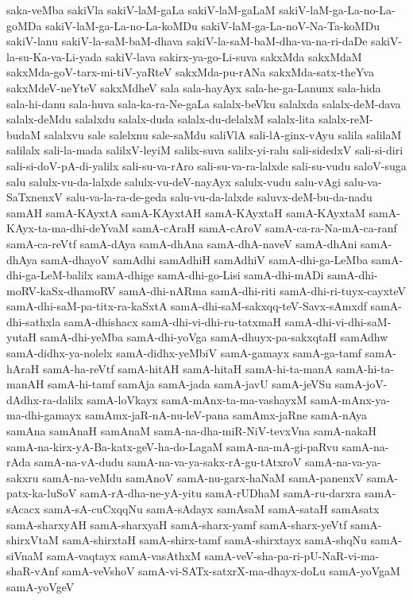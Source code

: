 {saka-veMba
sakiVla
sakiV-laM-gaLa
sakiV-laM-gaLaM
sakiV-laM-ga-La-no-La-goMDa
sakiV-laM-ga-La-no-La-koMDu
sakiV-laM-ga-La-noV-Na-Ta-koMDu
sakiV-lanu
sakiV-la-saM-baM-dhava
sakiV-la-saM-baM-dha-va-na-ri-daDe
sakiV-la-su-Ka-va-Li-yada
sakiV-lava
sakirx-ya-go-Li-suva
sakxMda
sakxMdaM
sakxMda-goV-tarx-mi-tiV-yaRteV
sakxMda-pu-rANa
sakxMda-satx-theYva
sakxMdeV-neYteV
sakxMdheV
sala
sala-hayAyx
sala-he-ga-Lanunx
sala-hida
sala-hi-danu
sala-huva
sala-ka-ra-Ne-gaLa
salalx-beVku
salalxda
salalx-deM-dava
salalx-deMdu
salalxdu
salalx-duda
salalx-du-delalxM
salalx-lita
salalx-reM-budaM
salalxvu
sale
salelxnu
sale-saMdu
saliVlA
sali-lA-ginx-vAyu
salila
salilaM
salilalx
sali-la-mada
salilxV-leyiM
salilx-suva
salilx-yi-ralu
sali-sidedxV
sali-si-diri
sali-si-doV-pA-di-yalilx
sali-su-va-rAro
sali-su-va-ra-lalxde
sali-su-vudu
saloV-suga
salu
salulx-vu-da-lalxde
salulx-vu-deV-nayAyx
salulx-vudu
salu-vAgi
salu-va-SaTxnenxV
salu-va-la-ra-de-geda
salu-vu-da-lalxde
saluvx-deM-bu-da-nadu
samAH
samA-KAyxtA
samA-KAyxtAH
samA-KAyxtaH
samA-KAyxtaM
samA-KAyx-ta-ma-dhi-deYvaM
samA-cAraH
samA-cAroV
samA-ca-ra-Na-mA-ca-ranf
samA-ca-reVtf
samA-dAya
samA-dhAna
samA-dhA-naveV
samA-dhAni
samA-dhAya
samA-dhayoV
samAdhi
samAdhiH
samAdhiV
samA-dhi-ga-LeMba
samA-dhi-ga-LeM-balilx
samA-dhige
samA-dhi-go-Lisi
samA-dhi-mADi
samA-dhi-moRV-kaSx-dhamoRV
samA-dhi-nARma
samA-dhi-riti
samA-dhi-ri-tuyx-cayxteV
samA-dhi-saM-pa-titx-ra-kaSxtA
samA-dhi-saM-sakxqq-teV-Savx-sAmxdf
samA-dhi-sathxla
samA-dhishacx
samA-dhi-vi-dhi-ru-tatxmaH
samA-dhi-vi-dhi-saM-yutaH
samA-dhi-yeMba
samA-dhi-yoVga
samA-dhuyx-pa-sakxqtaH
samAdhw
samA-didhx-ya-nolelx
samA-didhx-yeMbiV
samA-gamayx
samA-ga-tamf
samA-hAraH
samA-ha-reVtf
samA-hitAH
samA-hitaH
samA-hi-ta-manA
samA-hi-ta-manAH
samA-hi-tamf
samAja
samA-jada
samA-javU
samA-jeVSu
samA-joV-dAdhx-ra-dalilx
samA-loVkayx
samA-mAnx-ta-ma-vashayxM
samA-mAnx-ya-ma-dhi-gamayx
samAmx-jaR-nA-nu-leV-pana
samAmx-jaRne
samA-nAya
samAna
samAnaH
samAnaM
samA-na-dha-miR-NiV-tevxVna
samA-nakaH
samA-na-kirx-yA-Ba-katx-geV-ha-do-LagaM
samA-na-mA-gi-paRvu
samA-na-rAda
samA-na-vA-dudu
samA-na-va-ya-sakx-rA-gu-tAtxroV
samA-na-va-ya-sakxru
samA-na-veMdu
samAnoV
samA-nu-garx-haNaM
samA-panenxV
samA-patx-ka-luSoV
samA-rA-dha-ne-yA-yitu
samA-rUDhaM
samA-ru-darxra
samA-sAcacx
samA-sA-cuCxqqNu
samA-sAdayx
samAsaM
samA-sataH
samAsatx
samA-sharxyAH
samA-sharxyaH
samA-sharx-yamf
samA-sharx-yeVtf
samA-shirxVtaM
samA-shirxtaH
samA-shirx-tamf
samA-shirxtayx
samA-shqNu
samA-siVnaM
samA-vaqtayx
samA-vasAthxM
samA-veV-sha-pa-ri-pU-NaR-vi-ma-shaR-vAnf
samA-veVshoV
samA-vi-SATx-satxrX-ma-dhayx-doLu
samA-yoVgaM
samA-yoVgeV
}
